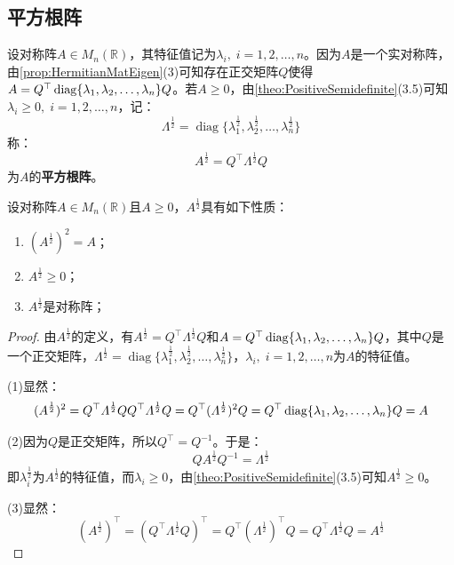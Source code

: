 \subsection{平方根阵}
\begin{definition}
	设对称阵$A\in M_n(\mathbb{R})$，其特征值记为$\lambda_i,\;i=1,2,\dots,n$。因为$A$是一个实对称阵，由\cref{prop:HermitianMatEigen}(3)可知存在正交矩阵$Q$使得$A=Q^{\top}\operatorname{diag}\{\lambda_1, \lambda_2, \dots, \lambda_{n}\}Q$。若$A\geqslant0$，由\cref{theo:PositiveSemidefinite}(3.5)可知$\lambda_i\geqslant0,\;i=1,2,\dots,n$，记：
	\begin{equation*}
		\varLambda^{\frac{1}{2}}=\operatorname{diag}\{\lambda_1^{\frac{1}{2}},\lambda_2^{\frac{1}{2}},\dots,\lambda_n^{\frac{1}{2}}\}
	\end{equation*}
	称：
	\begin{equation*}
		A^{\frac{1}{2}}=Q^{\top}\varLambda^{\frac{1}{2}} Q
	\end{equation*}
	为$A$的\textbf{平方根阵}。
\end{definition}
\begin{property}\label{prop:SquareRootMat}
	设对称阵$A\in M_n(\mathbb{R})$且$A\geqslant0$，$A^{\frac{1}{2}}$具有如下性质：
	\begin{enumerate}
		\item $(A^{\frac{1}{2}})^2=A$；
		\item $A^{\frac{1}{2}}\geqslant0$；
		\item $A^{\frac{1}{2}}$是对称阵；
	\end{enumerate}
\end{property}
\begin{proof}
	由$A^{\frac{1}{2}}$的定义，有$A^{\frac{1}{2}}=Q^{\top}\varLambda^{\frac{1}{2}}Q$和$A=Q^{\top}\operatorname{diag}\{\lambda_1, \lambda_2, \dots, \lambda_{n}\}Q$，其中$Q$是一个正交矩阵，$\varLambda^{\frac{1}{2}}=\operatorname{diag}\{\lambda_1^{\frac{1}{2}},\lambda_2^{\frac{1}{2}},\dots,\lambda_n^{\frac{1}{2}}\}$，$\lambda_i,\;i=1,2,\dots,n$为$A$的特征值。\par
	(1)显然：
	\begin{equation*}
		(A^{\frac{1}{2}})^2=Q^{\top}\varLambda^{\frac{1}{2}}QQ^{\top}\varLambda^{\frac{1}{2}}Q=Q^{\top}(\varLambda^{\frac{1}{2}})^2Q=Q^{\top}\operatorname{diag}\{\lambda_1, \lambda_2, \dots, \lambda_{n}\}Q=A
	\end{equation*}\par
	(2)因为$Q$是正交矩阵，所以$Q^{\top}=Q^{-1}$。于是：
	\begin{equation*}
		QA^{\frac{1}{2}}Q^{-1}=\varLambda^{\frac{1}{2}}
	\end{equation*}
	即$\lambda_i^{\frac{1}{2}}$为$A^{\frac{1}{2}}$的特征值，而$\lambda_i\geqslant0$，由\cref{theo:PositiveSemidefinite}(3.5)可知$A^{\frac{1}{2}}\geqslant0$。\par
	(3)显然：
	\begin{equation*}
		(A^{\frac{1}{2}})^{\top}=(Q^{\top}\varLambda^{\frac{1}{2}} Q)^{\top}=Q^{\top}(\varLambda^{\frac{1}{2}})^{\top}Q=Q^{\top}\varLambda^{\frac{1}{2}}Q=A^{\frac{1}{2}}
	\end{equation*}
\end{proof}
